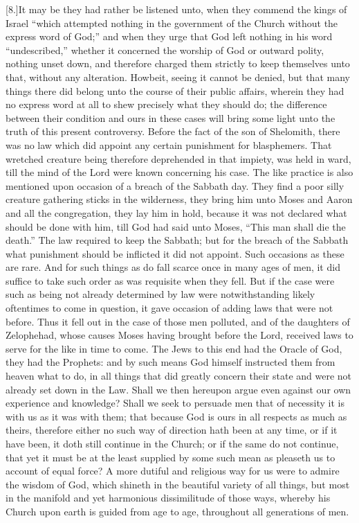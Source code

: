 [8.]It may be they had rather be listened unto, when they commend the kings of Israel “which attempted nothing in the government of the Church without the express word of God;” and when they urge that God left nothing in his word “undescribed,” whether it concerned the worship of God or outward polity, nothing unset down, and therefore  charged them strictly to keep themselves unto that, without any alteration. Howbeit, seeing it cannot be denied, but that many things there did belong unto the course of their public affairs, wherein they had no express word at all to shew precisely what they should do; the difference between their condition and ours in these cases will bring some light unto the truth of this present controversy. Before the fact of the son of Shelomith, there was no law which did appoint any certain punishment for blasphemers. That wretched creature being therefore deprehended in that impiety, was held in ward, till the mind of the Lord were known concerning his case. The like practice is also mentioned upon occasion of a breach of the Sabbath day. They find a poor silly creature gathering sticks in the wilderness, they bring him unto Moses and Aaron and all the congregation, they lay him in hold, because it was not declared what should be done with him, till God had said unto Moses, “This man shall die the death.” The law required to keep the Sabbath; but for the breach of the Sabbath what punishment should be inflicted it did not appoint. Such occasions as these are rare. And for such things as do fall scarce once in many ages of men, it did suffice to take such order as was requisite when they fell. But if the case were such as being not already determined by law were notwithstanding likely oftentimes to come in question, it gave occasion of adding laws that were not before. Thus it fell out in the case of those men polluted, and of the daughters of Zelophehad, whose causes Moses having brought before the Lord, received laws to serve for the like in time to come. The Jews to this end had the Oracle of God, they had the Prophets: and by such means God himself instructed them from heaven what to do, in all things that did greatly concern their state and were not already set down in the Law. Shall we then hereupon argue even against our own experience and knowledge? Shall we seek to persuade men that of necessity it is with us as it was with them; that because God is ours in all respects as much as theirs, therefore either no such way of direction hath been at any time, or if it have been, it doth still continue in the Church; or if the same  do not continue, that yet it must be at the least supplied by some such mean as pleaseth us to account of equal force? A more dutiful and religious way for us were to admire the wisdom of God, which shineth in the beautiful variety of all things, but most in the manifold and yet harmonious dissimilitude of those ways, whereby his Church upon earth is guided from age to age, throughout all generations of men.

